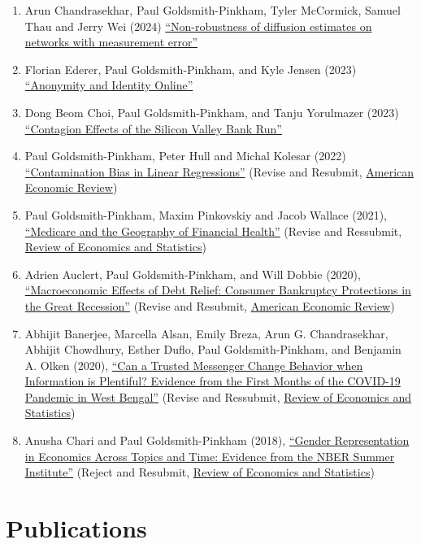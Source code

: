 \documentclass[letterpaper]{article}
\begin{document}
\begin{enumerate}
\item Arun Chandrasekhar, Paul Goldsmith-Pinkham, Tyler McCormick, Samuel Thau and Jerry Wei (2024) \href{https://paulgp.github.io/papers/diffusion_error_CGPMTW.pdf}{``Non-robustness of diffusion estimates on networks with measurement error''}
\item Florian Ederer, Paul Goldsmith-Pinkham, and Kyle Jensen (2023) \href{https://florianederer.github.io/ejmr.pdf}{``Anonymity and Identity Online''}
\item Dong Beom Choi, Paul Goldsmith-Pinkham, and Tanju Yorulmazer (2023) \href{https://arxiv.org/pdf/2308.06642.pdf}{``Contagion Effects of the Silicon Valley Bank Run''}
\item Paul Goldsmith-Pinkham, Peter Hull and Michal Kolesar (2022) \href{https://arxiv.org/abs/2106.05024}{``Contamination Bias in Linear Regressions''} (Revise and Resubmit, \ul{American Economic Review})
\item Paul Goldsmith-Pinkham, Maxim Pinkovskiy and Jacob Wallace (2021), \href{http://paulgp.github.io/papers/GPW_compressed.pdf}{``Medicare and the Geography of Financial Health''} (Revise and Ressubmit, \ul{Review of Economics and Statistics})
\item Adrien Auclert, Paul Goldsmith-Pinkham, and Will Dobbie (2020), \href{http://paulgp.github.io/papers/Macroeconomic_Effects_of_Debt_Relief_Posting_342019.pdf}{``Macroeconomic Effects of Debt Relief: Consumer Bankruptcy Protections in the Great Recession''} (Revise and Resubmit, \ul{American Economic Review})
\item Abhijit Banerjee, Marcella Alsan, Emily Breza, Arun G. Chandrasekhar, Abhijit Chowdhury, Esther Duflo, Paul Goldsmith-Pinkham, and Benjamin A. Olken (2020), \href{https://economics.mit.edu/sites/default/files/2022-08/wb_manuscript_final.pdf}{``Can a Trusted Messenger Change Behavior when Information is Plentiful? Evidence from the First Months of the COVID-19 Pandemic in West Bengal''}  (Revise and Ressubmit, \ul{Review of Economics and Statistics})
\item Anusha Chari and  Paul Goldsmith-Pinkham (2018), \href{http://paulgp.github.io/papers/cgp_nbergender.pdf}{``Gender Representation in Economics Across Topics and Time: Evidence from the NBER Summer Institute''} (Reject and Resubmit, \ul{Review of Economics and Statistics})
\end{enumerate}

\section*{Publications}
\end{document}
